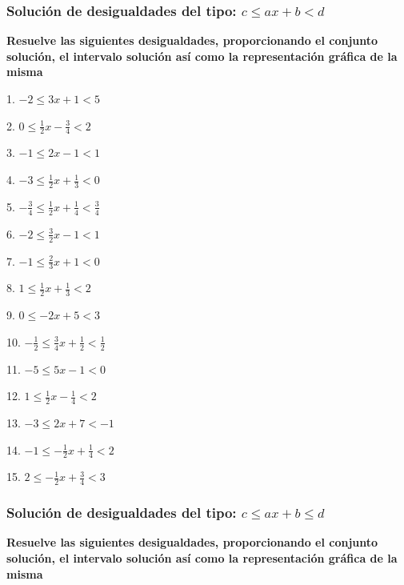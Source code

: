 \documentclass[12pt]{article}
\begin{document}
\subsubsection{\texorpdfstring{Solución de desigualdades del tipo:
\(c\leq ax+b <d\)}{Solución de desigualdades del tipo: c\textbackslash leq ax+b \textless d}}\label{soluciuxf3n-de-desigualdades-del-tipo-cleq-axb-d}
\textbf{Resuelve las siguientes desigualdades, proporcionando el
conjunto solución, el intervalo solución así como la representación
gráfica de la misma}

\begin{multicols}{2}
1. $-2\leq 3x+1<5$

2. $0\leq \frac{1}{2}x-\frac{3}{4}<2$

3. $-1\leq 2x-1<1$

4. $-3\leq \frac{1}{2}x+\frac{1}{3}<0$

5. $-\frac{3}{4}\leq \frac{1}{2}x+\frac{1}{4}<\frac{3}{4}$

6. $-2\leq \frac{3}{2}x-1<1$

7. $-1\leq \frac{2}{3}x+1<0$

8. $1\leq \frac{1}{2}x+\frac{1}{3}<2$

9. $0\leq -2x+5<3$

10. $-\frac{1}{2}\leq \frac{3}{4}x+\frac{1}{2}<\frac{1}{2}$

11. $-5\leq 5x-1<0$

12. $1\leq \frac{1}{2}x-\frac{1}{4}<2$

13. $-3\leq 2x+7<-1$

14. $-1\leq -\frac{1}{2}x+\frac{1}{4}<2$

15. $2\leq -\frac{1}{2}x+\frac{3}{4}<3$
\end{multicols}

\subsubsection{\texorpdfstring{Solución de desigualdades del tipo:
\(c\leq ax+b \leq d\)}{Solución de desigualdades del tipo: c\textbackslash leq ax+b \textbackslash leq d}}\label{soluciuxf3n-de-desigualdades-del-tipo-cleq-axb-leq-d}
\textbf{Resuelve las siguientes desigualdades, proporcionando el
conjunto solución, el intervalo solución así como la representación
gráfica de la misma}
\end{document}
